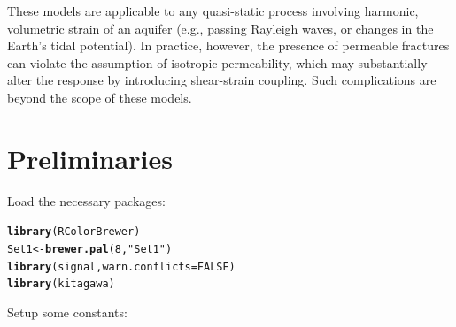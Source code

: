 \documentclass[12pt]{article}\usepackage[]{graphicx}\usepackage[]{color}
\makeatletter
\newcommand{\hlnum}[1]{\textcolor[rgb]{0.686,0.059,0.569}{#1}}%
\newcommand{\hlstr}[1]{\textcolor[rgb]{0.192,0.494,0.8}{#1}}%
\newcommand{\hlstd}[1]{\textcolor[rgb]{0.345,0.345,0.345}{#1}}%
\newcommand{\hlkwb}[1]{\textcolor[rgb]{0.69,0.353,0.396}{#1}}%
\newcommand{\hlkwc}[1]{\textcolor[rgb]{0.333,0.667,0.333}{#1}}%
\newcommand{\hlkwd}[1]{\textcolor[rgb]{0.737,0.353,0.396}{\textbf{#1}}}%
\newenvironment{kframe}{%
 \def\at@end@of@kframe{}%
 \ifinner\ifhmode%
  \def\at@end@of@kframe{\end{minipage}}%
  \begin{minipage}{\columnwidth}%
 \fi\fi%
 \def\FrameCommand##1{\hskip\@totalleftmargin \hskip-\fboxsep
 \colorbox{shadecolor}{##1}\hskip-\fboxsep
     \hskip-\linewidth \hskip-\@totalleftmargin \hskip\columnwidth}%
 \MakeFramed {\advance\hsize-\width
   \@totalleftmargin\z@ \linewidth\hsize
   \@setminipage}}%
 {\par\unskip\endMakeFramed%
 \at@end@of@kframe}
\newenvironment{knitrout}{}{} %
\makeatother
\begin{document}
 These models are applicable to any quasi-static process involving harmonic, 
 volumetric strain of an aquifer 
 (e.g., passing Rayleigh waves, or changes in the Earth's tidal potential). 
 In practice, however, the presence of permeable fractures can violate the
 assumption of isotropic permeability, which may substantially
 alter the response by introducing shear-strain coupling. Such
 complications are beyond the scope of these models.

\section{Preliminaries}



Load the necessary packages:

\begin{knitrout}\small
{}\color{fgcolor}\begin{kframe}
\begin{alltt}
\hlkwd{library}\hlstd{(RColorBrewer)}
\hlstd{Set1} \hlkwb{<-} \hlkwd{brewer.pal}\hlstd{(}\hlnum{8}\hlstd{,} \hlstr{"Set1"}\hlstd{)}
\hlkwd{library}\hlstd{(signal,} \hlkwc{warn.conflicts} \hlstd{=} \hlnum{FALSE}\hlstd{)}
\hlkwd{library}\hlstd{(kitagawa)}
\end{alltt}


{\ttfamily\noindent\itshape\color{messagecolor}{\#\# Loaded kitagawa (2.2.0) -- Spectral response of water wells}}\end{kframe}
\end{knitrout}

Setup some constants:
\end{document}
